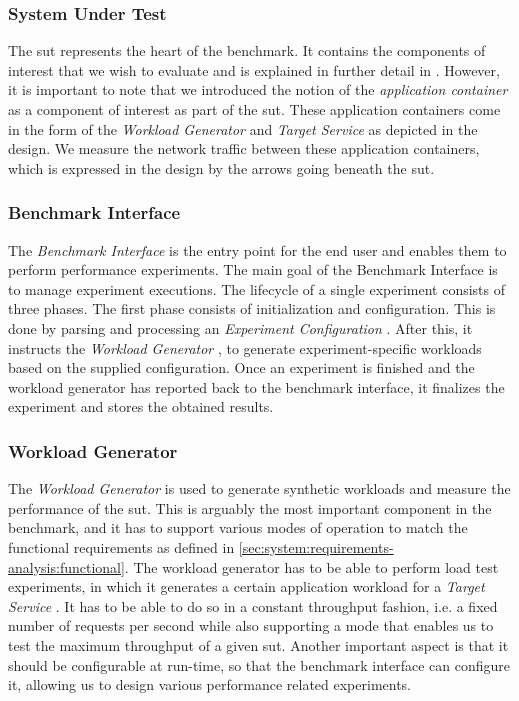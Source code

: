 \subsubsection{System Under Test}
The \gls{sut}  represents the heart of the benchmark. It contains the components of interest that we wish to evaluate and is explained in further detail in \label{sec:system:sut}. However, it is important to note that we introduced the notion of the \textit{application container} as a component of interest as part of the \gls{sut}. These application containers come in the form of the \textit{Workload Generator} and \textit{Target Service}  as depicted in the design. We measure the network traffic between these application containers, which is expressed in the design by the arrows going beneath the \gls{sut}.

\subsubsection{Benchmark Interface}
The \textit{Benchmark Interface}  is the entry point for the end user and enables them to perform performance experiments. The main goal of the Benchmark Interface is to manage experiment executions. The lifecycle of a single experiment consists of three phases. The first phase consists of initialization and configuration. This is done by parsing and processing an \textit{Experiment Configuration} . After this, it instructs the \textit{Workload Generator} , to generate experiment-specific workloads based on the supplied configuration. Once an experiment is finished and the workload generator has reported back to the benchmark interface, it finalizes the experiment and stores the obtained results.

\subsubsection{Workload Generator}
The \textit{Workload Generator}  is used to generate synthetic workloads and measure the performance of the \gls{sut}. This is arguably the most important component in the benchmark, and it has to support various modes of operation to match the functional requirements as defined in \cref{sec:system:requirements-analysis:functional}. The workload generator has to be able to perform load test experiments, in which it generates a certain application workload for a \textit{Target Service} . It has to be able to do so in a constant throughput fashion, i.e. a fixed number of requests per second while also supporting a mode that enables us to test the maximum throughput of a given \gls{sut}. Another important aspect is that it should be configurable at run-time, so that the benchmark interface  can configure it, allowing us to design various performance related experiments. 

